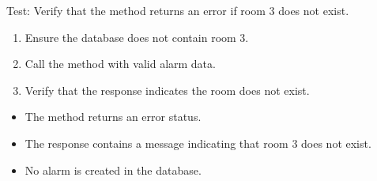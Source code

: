 \documentclass[letterpaper,10pt,english]{sphinxmanual}
\begin{document}

\begin{fulllineitems}
\label{\detokenize{test:test.test_alarm.test_create_alarm_level_room_not_exist}}
\pysigstartsignatures
\pysiglinewithargsret
{}
{}
{}
\pysigstopsignatures
\sphinxAtStartPar
Test: Verify that the method returns an error if room 3 does not exist.
\begin{description}
\begin{enumerate}
%
\item {} 
\sphinxAtStartPar
Ensure the database does not contain room 3.

\item {} 
\sphinxAtStartPar
Call the  method with valid alarm data.

\item {} 
\sphinxAtStartPar
Verify that the response indicates the room does not exist.

\end{enumerate}

\begin{itemize}
\item {} 
\sphinxAtStartPar
The method returns an error status.

\item {} 
\sphinxAtStartPar
The response contains a message indicating that room 3 does not exist.

\item {} 
\sphinxAtStartPar
No alarm is created in the database.

\end{itemize}

\end{description}

\end{fulllineitems}

\end{document}
